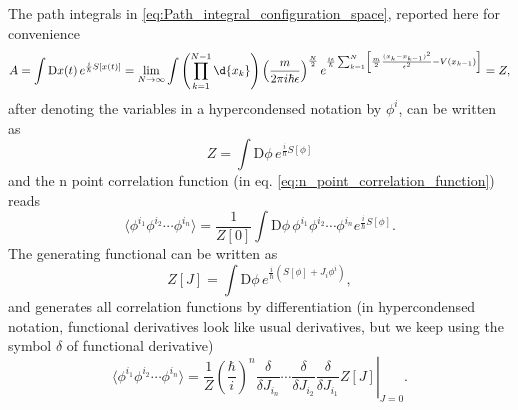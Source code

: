 The path integrals in \eqref{eq:Path_integral_configuration_space}, reported here for convenience
\[
    A = \int \mathrm{D} x(t) \, e^{\frac{i}{\hbar}S[x(t)]} = \lim_{N \to \infty} \int \left(\prod_{k=1}^{N-1} \d{x_k}\right) \left(\frac{m}{2\pi i \hbar \epsilon}\right)^{\frac{N}{2}} e^{\frac{i\epsilon}{\hbar}\sum_{k=1}^N \left[\frac{m}{2}\frac{(x_k - x_{k-1})^2}{\epsilon^2} - V(x_{k-1})\right]} = Z,
\]
after denoting the variables in a hypercondensed notation by \(\phi^i\), can be written as
\begin{equation}
    Z = \int \mathrm{D} \phi \, e^{\frac{i}{\hbar} S[\phi]}
    \label{eq:partition_function_hypercondensed}
\end{equation}
and the n point correlation function (in eq. \eqref{eq:n_point_correlation_function}) reads
\begin{equation}
    \langle \phi^{i_1} \phi^{i_2} \cdots \phi^{i_n} \rangle = \frac{1}{Z[0]} \int \mathrm{D} \phi \, \phi^{i_1} \phi^{i_2} \cdots \phi^{i_n} e^{\frac{i}{\hbar} S[\phi]}.
    \label{eq:n_point_correlation_function_hypercondensed}
\end{equation}
The generating functional can be written as
\begin{equation}
    Z[J] = \int \mathrm{D} \phi \, e^{\frac{i}{\hbar} \left( S[\phi] + J_i \phi^i \right)},
    \label{eq:generating_functional_hypercondensed}
\end{equation}
and generates all correlation functions by differentiation (in hypercondensed notation, functional derivatives look like usual derivatives, but we keep using the symbol \(\delta\) of functional derivative)
\[
    \langle \phi^{i_1} \phi^{i_2} \cdots \phi^{i_n} \rangle = \left. \frac{1}{Z} \left(\frac{\hbar}{i}\right)^n \frac{\delta}{\delta J_{i_n}} \cdots \frac{\delta}{\delta J_{i_2}} \frac{\delta}{\delta J_{i_1}} Z[J] \right|_{J=0}.
\]

